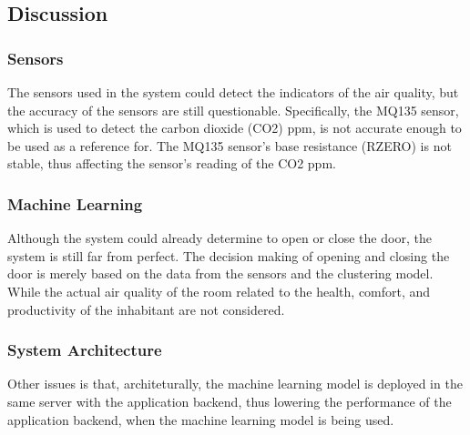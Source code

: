 \subsection{Discussion}
\subsubsection{Sensors}
The sensors used in the system could detect the
indicators of the air quality, but the accuracy
of the sensors are still questionable.
Specifically, the MQ135 sensor, which is used to
detect the carbon dioxide (CO2) ppm, is not
accurate enough to be used as a reference for.
The MQ135 sensor's base resistance (RZERO) is
not stable, thus affecting the sensor's
reading of the CO2 ppm.

\subsubsection{Machine Learning}
Although the system could already determine to open
or close the door, the system is still far from
perfect. The decision making of opening and closing
the door is merely based on the data from the
sensors and the clustering model. While the actual
air quality of the room related to the health,
comfort, and productivity of the inhabitant are not
considered.

\subsubsection{System Architecture}
Other issues is that, architeturally, the machine
learning model is deployed in the same server with
the application backend, thus lowering the
performance of the application backend, when the
machine learning model is being used.
